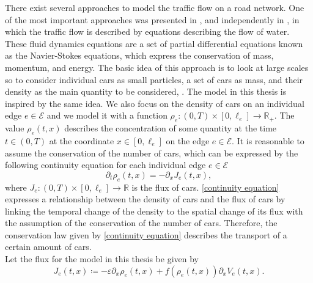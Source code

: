 There exist several approaches to model the traffic flow on a road network. One of the most important approaches was presented in \cite{LighthillWhitham:1955}, and independently in \cite{Richards:1956}, in which the traffic flow is described by equations describing the flow of water. These fluid dynamics equations are a set of partial differential equations known as the Navier-Stokes equations, which express the conservation of mass, momentum, and energy. The basic idea of this approach is to look at large scales so to consider individual cars as small particles, a set of cars as mass, and their density as the main quantity to be considered, \cite[p.~1]{GaravelloPiccoli:2006}. The model in this thesis is inspired by the same idea. We also focus on the density of cars on an individual edge $e \in \mathcal{E}$ and we model it with a function $\rho_e \colon (0, T) \times [0, \ell_e] \to \mathbb{R}_{+}$. The value $\rho_e (t,x)$ describes the concentration of some quantity at the time $t \in (0, T)$ at the coordinate $x \in [0, \ell_e]$ on the edge $e \in \mathcal{E}$. It is reasonable to assume the conservation of the number of cars, which can be expressed by the following continuity equation for each individual edge $e \in \mathcal{E}$
\begin{equation}
    \label{continuity equation}
    \partial_t \rho_e (t,x) = - \partial_x J_e(t,x),
\end{equation}
where $J_e \colon (0,T) \times [0, \ell_e] \to \mathbb{R}$ is the flux of cars. \cref{continuity equation} expresses a relationship between the density of cars and the flux of cars by linking the temporal change of the density to the spatial change of its flux with the assumption of the conservation of the number of cars. Therefore, the conservation law given by \cref{continuity equation} describes the transport of a certain amount of cars. \\
Let the flux for the model in this thesis be given by 
\begin{equation} 
    \label{eq:flux} 
    J_e(t,x) \coloneqq - \varepsilon \partial_x \rho_e (t, x) + f(\rho_e(t, x)) \partial_x V_e(t, x).
\end{equation}
